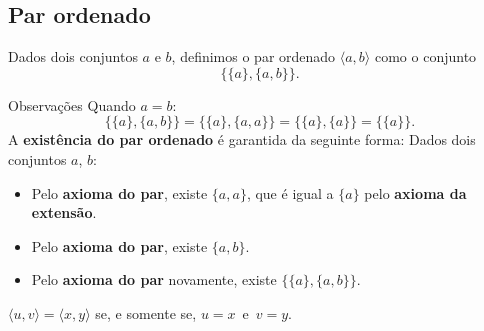      \subsection{Par ordenado} 
      \begin{definition}
      Dados dois conjuntos $a$ e $b$, definimos o par ordenado $\langle a ,b\rangle$ como o conjunto 
      $$\{\{a\},\{a, b\}\}.$$
      \end{definition}
      \begin{mymdframed}{Observações}
      Quando $a = b$:
      $$\{\{a\},\{a, b\}\} = \{\{a\},\{a, a\}\} = \{\{a\},\{a\}\} = \{\{a\}\}.$$
         A \textbf{existência do par ordenado} é garantida da seguinte forma:
         Dados dois conjuntos $a$, $b$: 
            \begin{itemize}      
               \item Pelo \textbf{axioma do par}, existe $\{a, a\}$, que é igual a $\{a\}$ pelo \textbf{axioma da extensão}.
               \item Pelo \textbf{axioma do par}, existe $\{a, b\}.$
               \item Pelo \textbf{axioma do par} novamente, existe $\{\{a\},\{a, b\}\}.$      
            \end{itemize}
      \end{mymdframed}
      \newpage
      \begin{theorem}
      $\langle u ,v\rangle = \langle x ,y\rangle$ se, e somente se, $u = x$\ e\ $v = y$.
      \end{theorem}
